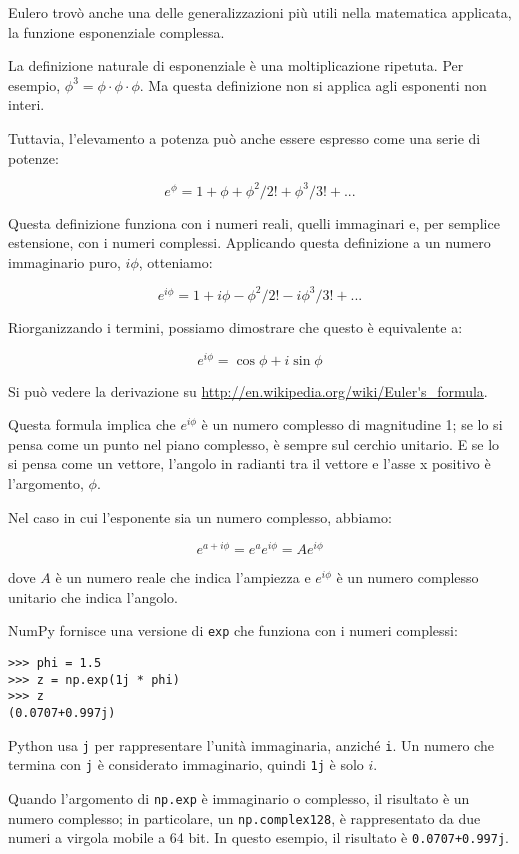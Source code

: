 \documentclass[12pt]{book} \usepackage[width=5.5in,height=8.5in, hmarginratio=3:2,vmarginratio=1:1]{geometry}
\begin{document}
Eulero trovò anche una delle generalizzazioni più utili nella matematica applicata, la funzione esponenziale complessa.

La definizione naturale di esponenziale è una moltiplicazione ripetuta. Per esempio, $\phi^3 = \phi \cdot \phi \cdot \phi$. Ma questa definizione non si applica agli esponenti non interi.

Tuttavia, l'elevamento a potenza può anche essere espresso come una serie di potenze:

%
\[ e^\phi = 1 + \phi + \phi^2/2! + \phi^3/3! + ... \] 

%
Questa definizione funziona con i numeri reali, quelli immaginari e, per semplice estensione, con i numeri complessi. Applicando questa definizione a un numero immaginario puro, $i\phi$, otteniamo:

%
\[ e^{i\phi} = 1 + i\phi - \phi^2/2! - i\phi^3/3! + ... \] 

%
Riorganizzando i termini, possiamo dimostrare che questo è equivalente a:

%
\[ e^{i\phi} = \cos \phi + i \sin \phi \] 

%
Si può vedere la derivazione su \url{http://en.wikipedia.org/wiki/Euler's_formula}.

Questa formula implica che $e^{i\phi}$ è un numero complesso di magnitudine 1; se lo si pensa come un punto nel piano complesso, è sempre sul cerchio unitario. E se lo si pensa come un vettore, l'angolo in radianti tra il vettore e l'asse x positivo è l'argomento, $\phi$.

Nel caso in cui l'esponente sia un numero complesso, abbiamo:

%
\[ e^{a + i\phi} = e^a e^{i\phi} = A e^{i\phi} \] 

%
dove $A$ è un numero reale che indica l'ampiezza e $e^{i\phi}$ è un numero complesso unitario che indica l'angolo.

NumPy fornisce una versione di {\tt exp} che funziona con i numeri complessi:

\begin{verbatim} 
>>> phi = 1.5
>>> z = np.exp(1j * phi)
>>> z
(0.0707+0.997j)
 \end{verbatim} 

Python usa {\tt j} per rappresentare l'unità immaginaria, anziché {\tt i}. Un numero che termina con {\tt j} è considerato immaginario, quindi {\tt 1j} è solo $i$.

Quando l'argomento di {\tt np.exp} è immaginario o complesso, il risultato è un numero complesso; in particolare, un {\tt np.complex128}, è rappresentato da due numeri a virgola mobile a 64 bit. In questo esempio, il risultato è {\tt 0.0707+0.997j}.
\end{document}
